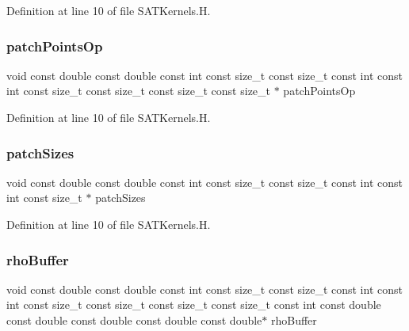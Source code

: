 Definition at line 10 of file S\+A\+T\+Kernels.\+H.

\hypertarget{SATKernels_8H_a8d092af5f58f1962e6b1c2564830eba6}{}\label{SATKernels_8H_a8d092af5f58f1962e6b1c2564830eba6} 
\subsubsection{\texorpdfstring{patch\+Points\+Op}{patchPointsOp}}
{\footnotesize\ttfamily void const double const double const int const size\+\_\+t const size\+\_\+t const int const int const size\+\_\+t const size\+\_\+t const size\+\_\+t const size\+\_\+t $\ast$ patch\+Points\+Op}



Definition at line 10 of file S\+A\+T\+Kernels.\+H.

\hypertarget{SATKernels_8H_aab9865bc07ba94e79eb63231f82f4d13}{}\label{SATKernels_8H_aab9865bc07ba94e79eb63231f82f4d13} 
\subsubsection{\texorpdfstring{patch\+Sizes}{patchSizes}}
{\footnotesize\ttfamily void const double const double const int const size\+\_\+t const size\+\_\+t const int const int const size\+\_\+t $\ast$ patch\+Sizes}



Definition at line 10 of file S\+A\+T\+Kernels.\+H.

\hypertarget{SATKernels_8H_ace59278fbe93d9a310adbae856537ab6}{}\label{SATKernels_8H_ace59278fbe93d9a310adbae856537ab6} 
\subsubsection{\texorpdfstring{rho\+Buffer}{rhoBuffer}}
{\footnotesize\ttfamily void const double const double const int const size\+\_\+t const size\+\_\+t const int const int const size\+\_\+t const size\+\_\+t const size\+\_\+t const size\+\_\+t const int const double const double const double const double const double$\ast$ rho\+Buffer}



